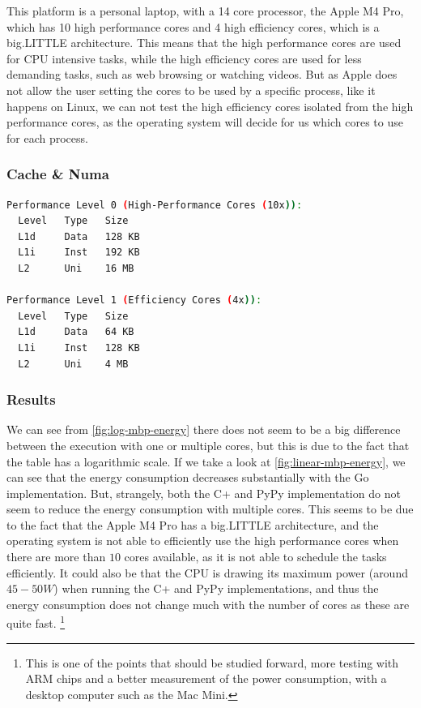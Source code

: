 This platform is a personal laptop, with a 14 core processor, the Apple M4 Pro, which has 10 high performance cores and 4 high efficiency cores, which is a big.LITTLE architecture. This means that the high performance cores are used for CPU intensive tasks, while the high efficiency cores are used for less demanding tasks, such as web browsing or watching videos. But as Apple does not allow the user setting the cores to be used by a specific process, like it happens on Linux, we can not test the high efficiency cores isolated from the high performance cores, as the operating system will decide for us which cores to use for each process. 

\subsubsection{Cache \& Numa}

\begin{lstlisting}[language=bash, caption={Cache of the Apple M4 Pro by performance level}, label={lst:apple-cache}]
Performance Level 0 (High-Performance Cores (10x)):
  Level   Type   Size
  L1d     Data   128 KB
  L1i     Inst   192 KB
  L2      Uni    16 MB

Performance Level 1 (Efficiency Cores (4x)):
  Level   Type   Size
  L1d     Data   64 KB
  L1i     Inst   128 KB
  L2      Uni    4 MB
\end{lstlisting}

\subsubsection{Results}






We can see from \autoref{fig:log-mbp-energy} there does not seem to be a big difference between the execution with one or multiple cores, but this is due to the fact that the table has a logarithmic scale. If we take a look at \autoref{fig:linear-mbp-energy}, we can see that the energy consumption decreases substantially with the Go implementation. But, strangely, both the C\++ and PyPy implementation do not seem to reduce the energy consumption with multiple cores. This seems to be due to the fact that the Apple M4 Pro has a big.LITTLE architecture, and the operating system is not able to efficiently use the high performance cores when there are more than $10$ cores available, as it is not able to schedule the tasks efficiently. It could also be that the CPU is drawing its maximum power (around $45-50W$) when running the C\++ and PyPy implementations, and thus the energy consumption does not change much with the number of cores as these are quite fast. \footnote{This is one of the points that should be studied forward, more testing with ARM chips and a better measurement of the power consumption, with a desktop computer such as the Mac Mini.}



